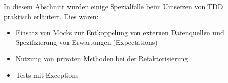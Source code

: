 In diesem Abschnitt wurden einige Spezialfälle beim Umsetzen von TDD praktisch erläutert. Dies waren:
\begin{itemize}
 \item Einsatz von Mocks zur Entkoppelung von externen Datenquellen und Spezifizierung von Erwartungen (Expectations)
 \item Nutzung von privaten Methoden bei der Refaktorisierung 
 \item Tests mit Exceptions
\end{itemize}